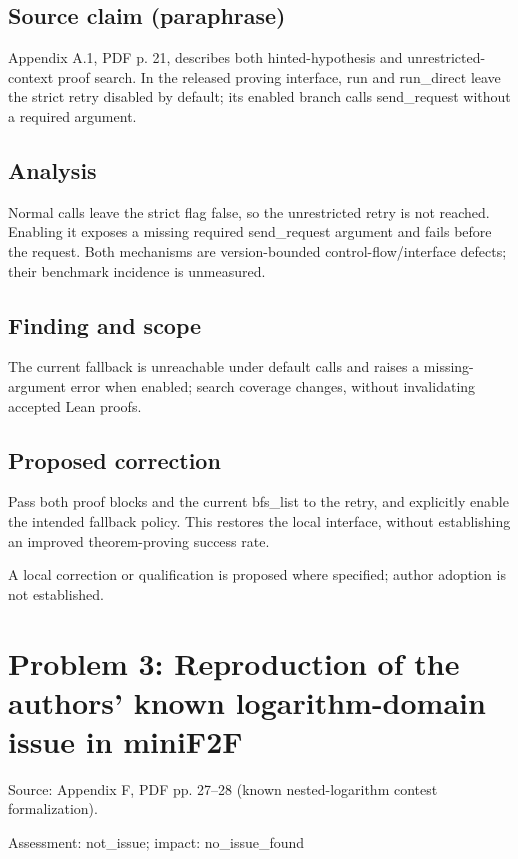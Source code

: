 \documentclass[11pt]{article}
\begin{document}
\subsection*{Source claim (paraphrase)}

Appendix A.1, PDF p. 21, describes both hinted-hypothesis and unrestricted-context proof search. In the released proving interface, run and run\_direct leave the strict retry disabled by default; its enabled branch calls send\_request without a required argument.

\subsection*{Analysis}

Normal calls leave the strict flag false, so the unrestricted retry is not reached. Enabling it exposes a missing required send\_request argument and fails before the request. Both mechanisms are version-bounded control-flow/interface defects; their benchmark incidence is unmeasured.

\subsection*{Finding and scope}

The current fallback is unreachable under default calls and raises a missing-argument error when enabled; search coverage changes, without invalidating accepted Lean proofs.

\subsection*{Proposed correction}

Pass both proof blocks and the current bfs\_list to the retry, and explicitly enable the intended fallback policy. This restores the local interface, without establishing an improved theorem-proving success rate.

A local correction or qualification is proposed where specified; author adoption is not established.

\section*{Problem 3: Reproduction of the authors’ known logarithm-domain issue in miniF2F}

Source: Appendix F, PDF pp. 27–28 (known nested-logarithm contest formalization).

Assessment: not\_issue; impact: no\_issue\_found
\end{document}
